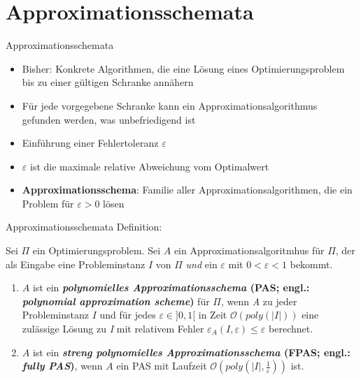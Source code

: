 \section{Approximationsschemata}
\begin{frame}{Approximationsschemata}


\begin{itemize}
\item Bisher: Konkrete Algorithmen, die eine Lösung eines Optimierungsproblem bis zu einer gültigen Schranke annähern
\item Für jede vorgegebene Schranke kann ein Approximationsalgorithmus gefunden werden, was unbefriedigend ist
\item Einführung einer Fehlertoleranz $\varepsilon$
\item $\varepsilon$ ist die maximale relative Abweichung vom Optimalwert
\item \textbf{Approximationsschema}: Familie aller Approximationsalgorithmen, die ein Problem für $\varepsilon > 0$ lösen
\end{itemize}
\end{frame}

\begin{frame}{Approximationsschemata}	
    Definition:
			
Sei $\Pi$ ein Optimierungsproblem. Sei $A$ ein Approximationsalgoritmhus für $\Pi$, der als Eingabe eine Probleminstanz $I$ von $\Pi$ \textit{und} ein $\varepsilon$ mit $0 < \varepsilon < 1$ bekommt.

\begin{enumerate}
\item
$A$ ist ein \textbf{\textit{polynomielles Approximationsschema} (PAS; engl.: \textit{polynomial approximation scheme})} für $\Pi$, wenn \textit{A} zu jeder Probleminstanz $I$ und für jedes $\varepsilon \in ] 0,1 [$ in Zeit $\mathcal O(poly(|I|))$ eine zulässige Lösung zu \textit{I} mit relativem Fehler $\varepsilon_A(\textit{I},\varepsilon) \le \varepsilon$ berechnet.

\item
$A$ ist ein \textbf{\textit{streng polynomielles Approximationsschema} (FPAS; engl.: \textit{fully PAS})}, wenn $A$ ein PAS mit Laufzeit $\mathcal O(poly(|I|, \frac{1}{\varepsilon}))$ ist.

\end{enumerate}		      
\end{frame}

